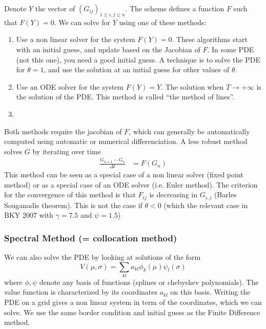 \documentclass[english]{article}
\begin{document}
Denote $Y$ the vector of  $(G_{ij})_{1 \leq i,j\leq n}$. The scheme  defines a function $F$ such that $F(Y) = 0$. We can solve for $Y$ using one of these methods:
\begin{enumerate}
	\item Use a non linear solver for the system $F(Y) = 0$. These algorithms start with an initial guess, and update based on the Jacobian of $F$. In some PDE (not this one), you need a good initial guess. A technique is to solve the PDE for $\theta = 1$, and use the solution at an initial guess for other values of $\theta$.
	\item Use an ODE solver for the system $F(Y) = \dot{Y}$. The solution when $T\rightarrow +\infty$ is the solution of the PDE. This method is called ``the method of lines''.
	\item 
\end{enumerate}
Both methods require the jacobian of $F$, which can generally be automatically computed using automatic or numerical differenciation. 
A less robust method solves $G$ by iterating over time
\begin{align*}
	\frac{G_{n+1}-G_n}{\Delta t} &= F(G_n)
\end{align*}
This method can be seen as a special case of a non linear solver (fixed point method) or as a special case of an ODE solver (i.e. Euler method). The criterion for the convergence of this method is that $F_{ij}$ is decreasing in $G_{i,j}$ (Barles Souganadis theorem). This is not the case if $\theta < 0$ (which the relevant case in BKY 2007 with $\gamma = 7.5$ and $\psi = 1.5$)

\subsubsection{Spectral Method (= collocation method)}
We can also solve the PDE by looking at solutions of the form
$$V(\mu, \sigma) = \sum_{kl} a_{kl} \phi_k(\mu)\psi_l(\sigma)$$
where $\phi, \psi$ denote any basis of functions (splines or chebyshev polynomials).
The value function is characterized by its coordinates $a_{kl}$ on this basis. Writing the PDE on a grid gives a non linear system in term of the coordinates, which we can solve. We use the same border condition and initial guess as the Finite Difference method.
\end{document}
